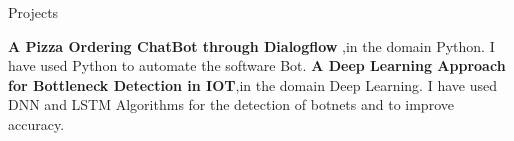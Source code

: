 \begin{rubric}{Projects}

\entry*[2022] \textbf{A Pizza Ordering ChatBot through Dialogflow },in the domain Python. I have used Python to automate the software Bot.
\entry*[2023] \textbf{A Deep Learning Approach for Bottleneck Detection in IOT},in the domain Deep Learning. I have used DNN and LSTM Algorithms for the detection of botnets and to improve accuracy.

\end{rubric}
